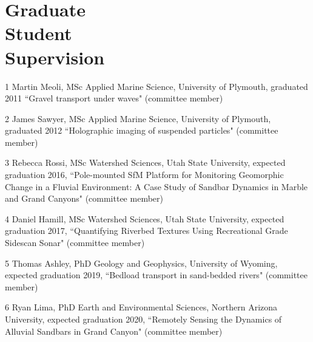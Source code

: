 \documentclass[margin,line]{resume}
\begin{document}
\begin{resume}
\begin{footnotesize}
\begin{list1}
	\end{list1}
        \end{footnotesize}

    \section{\mysidestyle Graduate \\ Student \\ Supervision}
        \begin{footnotesize}
	\begin{list1}
        \item[1] Martin Meoli, MSc Applied Marine Science, University of Plymouth, graduated 2011 ``Gravel transport under waves" (committee member)\\
        \item[2] James Sawyer, MSc Applied Marine Science, University of Plymouth, graduated 2012 ``Holographic imaging of suspended particles" (committee member) \\  
        \item[3] Rebecca Rossi, MSc Watershed Sciences, Utah State University, expected graduation 2016, ``Pole-mounted SfM Platform for Monitoring Geomorphic Change in a Fluvial Environment: A Case Study of Sandbar Dynamics in Marble and Grand Canyons" (committee member)\\
        \item[4] Daniel Hamill, MSc Watershed Sciences, Utah State University, expected graduation 2017, ``Quantifying Riverbed Textures Using Recreational Grade Sidescan Sonar" (committee member)\\
        \item[5] Thomas Ashley, PhD Geology and Geophysics, University of Wyoming, expected graduation 2019, ``Bedload transport in sand-bedded rivers" (committee member)        \\
        \item[6] Ryan Lima, PhD Earth and Environmental Sciences, Northern Arizona University, expected graduation 2020, ``Remotely Sensing the Dynamics of Alluvial Sandbars in Grand Canyon" (committee member)         

       	\end{list1} 
        \end{footnotesize}          	


\end{resume}
\end{document}

